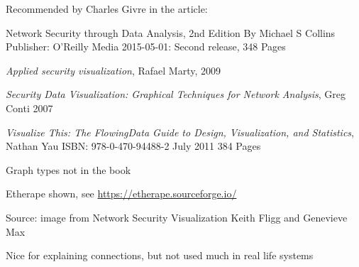 \documentclass[Screen16to9,17pt]{foils}
\begin{document}
Recommended by Charles Givre in the article:\\




Network Security through Data Analysis, 2nd Edition
By Michael S Collins
Publisher: O'Reilly Media
2015-05-01: Second release, 348 Pages

\begin{list2}
\item \emph{Applied security visualization}, Rafael Marty, 2009
\item \emph{Security Data Visualization: Graphical Techniques for Network Analysis}, Greg Conti 2007
\item \emph{Visualize This: The FlowingData Guide to Design, Visualization, and Statistics}, Nathan Yau
ISBN: 978-0-470-94488-2 July 2011 384 Pages
\end{list2}





\begin{list2}
  \item Graph types not in the book
  \item Etherape shown, see \url{https://etherape.sourceforge.io/}
\end{list2}



Source: image from Network Security Visualization Keith Fligg and Genevieve Max\\

\begin{list2}
\item {}
\item Nice for explaining connections, but not used much in real life systems
\end{list2}





\end{document}
